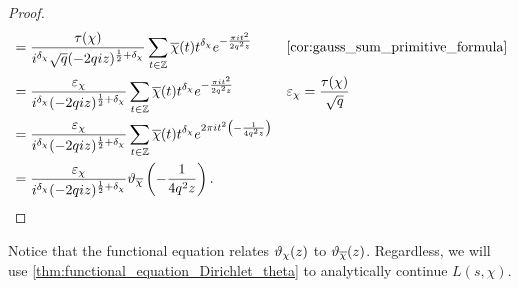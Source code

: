 \begin{proof}
\begin{align*}
          &= \frac{\tau(\chi)}{i^{\d_{\chi}}\sqrt{q}(-2qiz)^{\frac{1}{2}+\d_{\chi}}}\sum_{t \in \Z}\cchi(t)t^{\d_{\chi}}e^{-\frac{\pi it^{2}}{2q^{2}z}} && \text{\cref{cor:gauss_sum_primitive_formula}} \\
          &= \frac{\e_{\chi}}{i^{\d_{\chi}}(-2qiz)^{\frac{1}{2}+\d_{\chi}}}\sum_{t \in \Z}\cchi(t)t^{\d_{\chi}}e^{-\frac{\pi it^{2}}{2q^{2}z}} && \text{$\e_{\chi} = \frac{\tau(\chi)}{\sqrt{q}}$} \\
          &= \frac{\e_{\chi}}{i^{\d_{\chi}}(-2qiz)^{\frac{1}{2}+\d_{\chi}}}\sum_{t \in \Z}\cchi(t)t^{\d_{\chi}}e^{2\pi it^{2}\left(-\frac{1}{4q^{2}z}\right)} \\
          &=  \frac{\e_{\chi}}{i^{\d_{\chi}}(-2qiz)^{\frac{1}{2}+\d_{\chi}}}\vt_{\cchi}\left(-\frac{1}{4q^{2}z}\right).
        \end{align*}
      \end{proof}

      Notice that the functional equation relates $\vartheta_{\chi}(z)$ to $\vartheta_{\overline{\chi}}(z)$. Regardless, we will use \cref{thm:functional_equation_Dirichlet_theta} to analytically continue $L(s,\chi)$.
